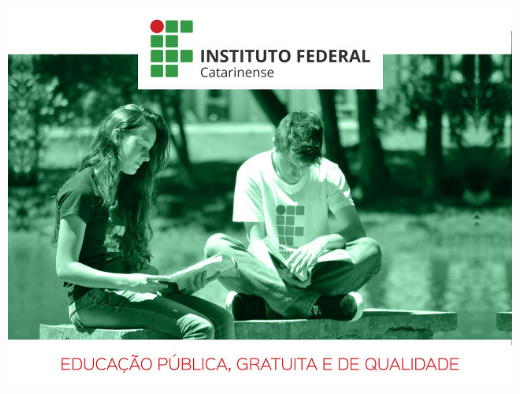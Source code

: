 \documentclass[xcolor=dvipsnames,table]{beamer}
\begin{document}
{
\usebackgroundtemplate%
{%
    \includegraphics[width=\paperwidth,height=\paperheight]{ultima-pag-menor.jpg}%
}
\begin{frame}[plain]{}
\end{frame}
}
	
\end{document}
